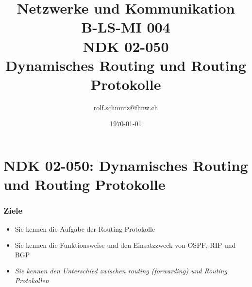 \documentclass[ignorenonframetext]{beamer}
\date{\today}
\author{rolf.schmutz@fhnw.ch}
\institute{FHNW}
\title{Netzwerke und Kommunikation\\B-LS-MI 004\\NDK 02-050\\Dynamisches Routing und Routing Protokolle}
\begin{document}

\section{NDK 02-050: Dynamisches Routing und Routing Protokolle}



\begin{frame}
\titlepage
\end{frame}




\begin{frame}
\frametitle{Ziele}
\begin{itemize}
	\item{Sie kennen die Aufgabe der Routing Protokolle}
	\item{Sie kennen die Funktionsweise und den Einsatzzweck von OSPF, RIP und BGP}
	\item{{\em Sie kennen den Unterschied zwischen routing (forwarding) und Routing Protokollen}}
\end{itemize}
\end{frame}
\end{document}
